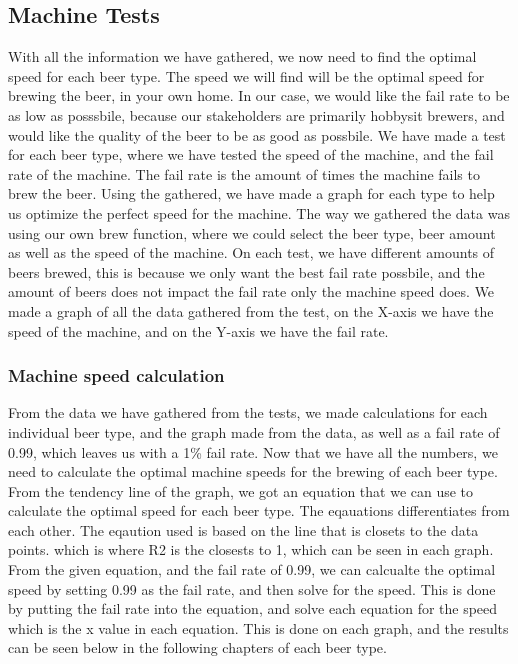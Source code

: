 \subsection{Machine Tests}
With all the information we have gathered, we now need to find the optimal speed for each beer type. The speed we will find will be the optimal speed for brewing the beer, in your own home. In our case,
we would like the fail rate to be as low as posssbile, because our stakeholders are primarily hobbysit brewers, and would like the quality of the beer to be as good as possbile.
We have made a test for each beer type, where we have tested the speed of the machine, and the fail rate of the machine. The fail rate is the amount of times the machine fails to brew the beer.
Using the gathered, we have made a graph for each type to help us optimize the perfect speed for the machine. \newline
The way we gathered the data was using our own brew function, where we could select the beer type, beer amount as well as the speed of the machine. On each test, we have different amounts of beers brewed, this is because we only want the best fail rate possbile, and the amount of beers does not impact the fail rate only the machine speed does.
We made a graph of all the data gathered from the test, on the X-axis we have the speed of the machine, and on the Y-axis we have the fail rate. \newline

\subsubsection{Machine speed calculation}
From the data we have gathered from the tests, we made calculations for each individual beer type, and the graph made from the data, as well as a fail rate of 0.99, 
which leaves us with a 1\% fail rate. Now that we have all the numbers, we need to calculate the optimal machine speeds for the brewing of each beer type. \newline
From the tendency line of the graph, we got an equation that we can use to calculate the optimal speed for each beer type. The eqauations differentiates from each other. The eqaution used is based on the line that is closets to the data points. which is where R2 is the closests to 1, which can be seen in each graph. \newline
From the given equation, and the fail rate of 0.99, we can calcualte the optimal speed by setting 0.99 as the fail rate, and then solve for the speed. This is done by putting the fail rate into the equation, and solve each equation for the speed which is the x value in each equation. \newline
This is done on each graph, and the results can be seen below in the following chapters of each beer type. \newline



